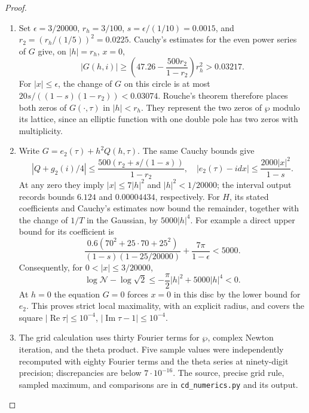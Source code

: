 \begin{proof}
\begin{enumerate}[label=\arabic*.,leftmargin=*]
\item Set $\epsilon=3/20000$, $r_h=3/100$, $s=\epsilon/(1/10)=0.0015$,
and $r_2=(r_h/(1/5))^2=0.0225$.
Cauchy's estimates for the even power series of $G$ give, on
$|h|=r_h$, $x=0$,
\[
 |G(h,i)|\geq
 \left(47.26-\frac{500r_2}{1-r_2}\right)r_h^2>0.03217.
\]
For $|x|\leq\epsilon$, the change of $G$ on this circle is at most
$20s/((1-s)(1-r_2))<0.03074$. Rouche's theorem therefore places both
zeros of $G(\cdot,\tau)$ in $|h|<r_h$. They represent the two zeros of
$\wp$ modulo its lattice, since an elliptic function with one double
pole has two zeros with multiplicity.

\item Write $G=e_2(\tau)+h^2Q(h,\tau)$. The same Cauchy bounds give
\[
 |Q+g_2(i)/4|\leq
 \frac{500(r_2+s/(1-s))}{1-r_2},
\quad
 |e_2(\tau)-idx|\leq
 \frac{2000|x|^2}{1-s}.
\]
At any zero they imply $|x|\leq7|h|^2$ and $|h|^2<1/20000$;
the interval output records bounds $6.124$ and $0.00004434$,
respectively. For $H$, its stated coefficients and Cauchy's estimates
now bound the remainder, together with the change of $1/T$ in the
Gaussian, by $5000|h|^4$. For example a direct upper bound for its
coefficient is
\[
 \frac{0.6(70^2+25\cdot70+25^2)}
 {(1-s)(1-25/20000)}+\frac{7\pi}{1-\epsilon}<5000.
\]
Consequently, for $0<|x|\leq3/20000$,
\[
 \log\mathcal N-\log\sqrt2
 \leq-\frac\pi2|h|^2+5000|h|^4<0.
\]
At $h=0$ the equation $G=0$ forces $x=0$ in this disc by the lower
bound for $e_2$. This proves strict local maximality, with an explicit
radius, and covers the square
$|\operatorname{Re}\tau|\leq10^{-4}$,
$|\operatorname{Im}\tau-1|\leq10^{-4}$.

\item The grid calculation uses thirty Fourier terms for $\wp$, complex
Newton iteration, and the theta product. Five sample values were
independently recomputed with eighty Fourier terms and the theta series
at ninety-digit precision; discrepancies are below $7\cdot10^{-16}$.
The source, precise grid rule, sampled maximum, and comparisons are in
\texttt{cd\_numerics.py} and its output.
\end{enumerate}
\end{proof}

